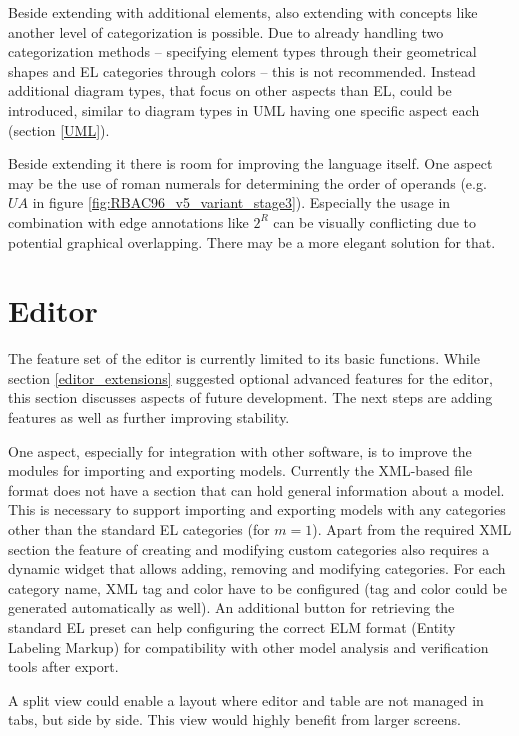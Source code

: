 \documentclass[twoside, openright, 12pt]{book}
\begin{document}
\noindent
Beside extending with additional elements, also extending with concepts like another level of categorization is possible.
Due to already handling two categorization methods -- specifying element types through their geometrical shapes and EL categories through colors -- this is not recommended.
Instead additional diagram types, that focus on other aspects than EL, could be introduced, similar to diagram types in UML having one specific aspect each (section \ref{UML}).

Beside extending it there is room for improving the language itself.
One aspect may be the use of roman numerals for determining the order of operands (e.g.\ $\mathit{UA}$ in figure \ref{fig:RBAC96_v5_variant_stage3}).
Especially the usage in combination with edge annotations like $2^R$ can be visually conflicting due to potential graphical overlapping.
There may be a more elegant solution for that.



\section{Editor}
\label{future_editor}
The feature set of the editor is currently limited to its basic functions.
While section \ref{editor_extensions} suggested optional advanced features for the editor, this section discusses aspects of future development.
The next steps are adding features as well as further improving stability.

One aspect, especially for integration with other software, is to improve the modules for importing and exporting models.
Currently the XML-based file format does not have a section that can hold general information about a model.
This is necessary to support importing and exporting models with any categories other than the standard EL categories (for $m=1$).
Apart from the required XML section the feature of creating and modifying custom categories also requires a dynamic widget that allows adding, removing and modifying categories. 
For each category name, XML tag and color have to be configured (tag and color could be generated automatically as well).
An additional button for retrieving the standard EL preset can help configuring the correct ELM format (Entity Labeling Markup) for compatibility with other model analysis and verification tools after export.

A split view could enable a layout where editor and table are not managed in tabs, but side by side.
This view would highly benefit from larger screens.
\end{document}
